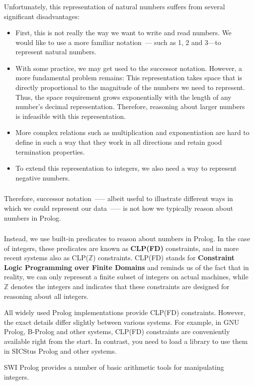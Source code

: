 \begin{frame}[shrink=4]
	\frametitle{\insertsection}
	
	Unfortunately, this representation of natural numbers suffers from several significant disadvantages:
	\begin{itemize}
		\item First, this is not really the way we want to write and read numbers. We would like to use a more familiar notation~--- such as 1, 2 and 3—to represent natural numbers.
		\item With some practice, we may get used to the successor notation. However, a more fundamental problem remains: This representation takes space that is directly proportional to the magnitude of the numbers we need to represent. Thus, the space requirement grows exponentially with the length of any number's decimal representation. Therefore, reasoning about larger numbers is infeasible with this representation.
		\item More complex relations such as multiplication and exponentiation are hard to define in such a way that they work in all directions and retain good termination properties.
		\item To extend this representation to integers, we also need a way to represent negative numbers.
	\end{itemize}
	
\end{frame}


\begin{frame}
	\frametitle{\insertsection}
	\justifying
	Therefore, successor notation~—-- albeit useful to illustrate different ways in which we could represent our data~—-- is not how we typically reason about numbers in Prolog.
\end{frame}


\begin{frame}
	\frametitle{\insertsection}
	\justifying
	Instead, we use built-in predicates to reason about numbers in Prolog. In the case of integers, these predicates are known as \textbf{CLP(FD)} constraints, and in more recent systems also as CLP(\(\mathds{Z} \)) constraints. CLP(FD) stands for \textbf{Constraint Logic Programming over Finite Domains} and reminds us of the fact that in reality, we can only represent a finite subset of integers on actual machines, while \(\mathds{Z} \) denotes the integers and indicates that these constraints are designed for reasoning about all integers.
	
	All widely used Prolog implementations provide CLP(FD) constraints. However, the exact details differ slightly between various systems. For example, in GNU Prolog, B-Prolog and other systems, CLP(FD) constraints are conveniently available right from the start. In contrast, you need to load a library to use them in SICStus Prolog and other systems.
	
	SWI Prolog provides a number of basic arithmetic tools for manipulating integers.
\end{frame}


